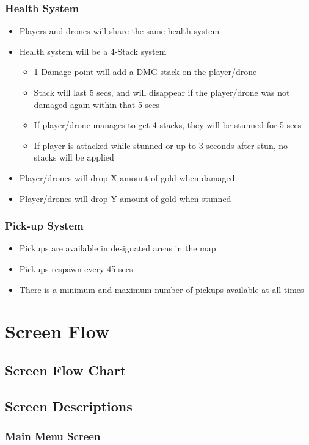 \documentclass[14pt]{report}
\begin{document}
\subsubsection{Health System}
\begin{itemize}
    \item Players and drones will share the same health system
    \item Health system will be a 4-Stack system
    \begin{itemize}
        \item 1 Damage point will add a DMG stack on the player/drone
        \item Stack will last 5 secs, and will disappear if the player/drone was not damaged again within that 5 secs
        \item If player/drone manages to get 4 stacks, they will be stunned for 5 secs
        \item If player is attacked while stunned or up to 3 seconds after stun, no stacks will be applied
    \end{itemize}
    \item Player/drones will drop X amount of gold when damaged
    \item Player/drones will drop Y amount of gold when stunned
\end{itemize}
\subsubsection{Pick-up System}
\begin{itemize}
    \item Pickups are available in designated areas in the map
    \item Pickups respawn every 45 secs
    \item There is a minimum and maximum number of pickups available at all times
\end{itemize}
\section{Screen Flow}
\subsection{Screen Flow Chart}
\subsection{Screen Descriptions}
\subsubsection{Main Menu Screen}
\end{document}
